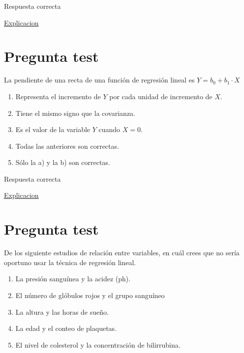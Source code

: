 \documentclass[
]{book}
\providecommand{\tightlist}{%
  \setlength{\itemsep}{0pt}\setlength{\parskip}{0pt}}
\begin{document}
Respuesta correcta

\href{https://1fjmanzano.github.io/bioestadistica/relaci\%C3\%B3n-entre-variables-nume\%CC\%81ricas.html\#covarianza}{Explicacion}

\hypertarget{pregunta-test-123}{%
\section{Pregunta test}\label{pregunta-test-123}}

La pendiente de una recta de una función de regresión lineal es \(Y = b_0 + b_1 \cdot X\)

\begin{enumerate}
\def\labelenumi{\alph{enumi})}
\tightlist
\item
  Representa el incremento de \(Y\) por cada unidad de incremento de \(X\).
\item
  Tiene el mismo signo que la covarianza.
\item
  Es el valor de la variable \(Y\) cuando \(X=0\).
\item
  Todas las anteriores son correctas.
\item
  Sólo la a) y la b) son correctas.
\end{enumerate}

Respuesta correcta

\href{https://1fjmanzano.github.io/bioestadistica/relaci\%C3\%B3n-entre-variables-nume\%CC\%81ricas.html\#regresio\%CC\%81n-lineal}{Explicacion}

\hypertarget{pregunta-test-124}{%
\section{Pregunta test}\label{pregunta-test-124}}

De los siguiente estudios de relación entre variables, en cuál crees que no sería oportuno usar la técnica de regresión lineal.

\begin{enumerate}
\def\labelenumi{\alph{enumi})}
\tightlist
\item
  La presión sanguínea y la acidez (ph).
\item
  El número de glóbulos rojos y el grupo sanguíneo
\item
  La altura y las horas de sueño.
\item
  La edad y el conteo de plaquetas.
\item
  El nivel de colesterol y la concentración de bilirrubina.
\end{enumerate}
\end{document}
